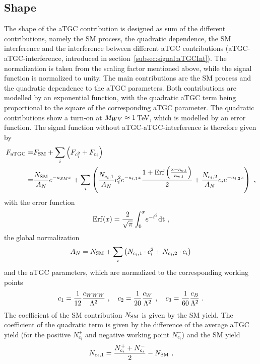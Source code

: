 \subsection*{Shape}
The shape of the aTGC contribution is designed as sum of the different contributions, namely the SM process, the quadratic dependence, the SM interference and the interference between different aTGC contributions (aTGC-aTGC-interference, introduced in section~\ref{subsec:signal:aTGCInt}). The normalization is taken from the scaling factor mentioned above, while the signal function is normalized to unity. The main contributions are the SM process and the quadratic dependence to the aTGC parameters. Both contributions are modelled by an exponential function, with the quadratic aTGC term being proportional to the square of the corresponding aTGC parameter. The quadratic contributions show a turn-on at $M_{WV} \approx 1$\,TeV, which is modelled by an error function. The signal function without aTGC-aTGC-interference is therefore given by
\begin{align}
F_{\rm aTGC} =& F_{\rm SM} + \sum_i \left( F_{c_i^2} + F_{c_i} \right) \\
=& \frac{N_{\rm SM}}{A_N} e^{-a_{SM}x} + \sum_i \left( \frac{N_{c_i,1}}{A_N} c_i^2 e^{-a_{i,1} x} \frac{1+\rm{Erf}\left(\frac{x-a_{o,i}}{a_{w,i}}\right)}{2} + \frac{N_{c_i,2}}{A_N} c_i e^{-a_{i,2}x} \right)  ~,
\label{eq:signal:sigfunc}
\end{align}
with the error function
\begin{equation}
{\rm Erf}(x) = \frac{2}{\sqrt{\pi}}\int_0^x \! e^{-t^2}{\rm dt} ~,
\end{equation}
the global normalization
\begin{equation}
A_N = N_{\rm SM} + \sum_i \left( N_{c_i,1}\cdot c_i^2 + N_{c_i,2}\cdot c_i \right) 
\label{eq:signal:globnorm}
\end{equation} 
and the aTGC parameters, which are normalized to the corresponding working points
\begin{equation}
c_1 = \frac{1}{12}\frac{c_{WWW}}{\Lambda^2} ~ , \quad c_2 = \frac{1}{20}\frac{c_{W}}{\Lambda^2} ~ , \quad c_3 = \frac{1}{60}\frac{c_{B}}{\Lambda^2} ~.
\end{equation}
The coefficient of the SM contribution $N_{\rm SM}$ is given by the SM yield. The coefficient of the quadratic term is given by the difference of the average aTGC yield (for the positive $N_{c_i}^{+}$ and negative working point $N_{c_i}^{-}$) and the SM yield
\begin{equation}
N_{c_i,1} = \frac{N_{c_i}^{+}+N_{c_i}^{-}}{2}-N_{\rm SM} ~,
\label{eq:signal:n1}
\end{equation}
